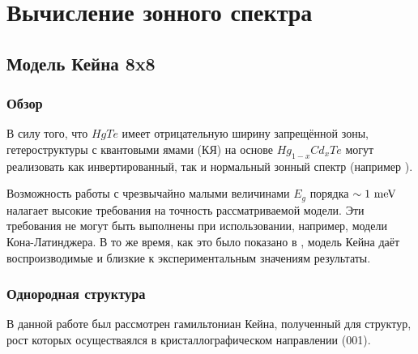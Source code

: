 \documentclass[../main.tex]{subfiles}
\begin{document}
    \chapter{Вычисление зонного спектра \label{chapter:calcs}}

    \section{Модель Кейна 8x8}

    \subsection{Обзор}

    В силу того, что $HgTe$ имеет отрицательную ширину запрещённой зоны,
    гетероструктуры с квантовыми ямами (КЯ) на основе $Hg_{1-x}Cd_{x}Te$ 
    могут реализовать как инвертированный, так и нормальный зонный спектр
    (например \cite{MinkovValence2017}).

    Возможность работы с чрезвычайно малыми величинами $E_g$ порядка
    $\sim 1~\text{meV}$ налагает высокие требования на точность рассматриваемой 
    модели. Эти требования не могут быть выполнены при использовании,
    например, модели Кона-Латинджера. В то же время, как это было показано
    в \cite{Novik:2005}, \cite{Zholudev:Magnet:2012} модель Кейна 
    \cite{Kane:Band:1957} даёт воспроизводимые и близкие к экспериментальным 
    значениям результаты.

    \subsection{Однородная структура}

    В данной работе был рассмотрен гамильтониан Кейна, 
    полученный для структур, рост которых осуществаялся в 
    кристаллографическом направлении (001).
\end{document}
